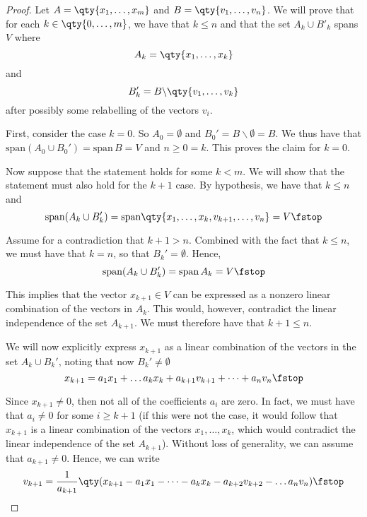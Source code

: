 \begin{proof}
  Let \( A=\qty{x_1,\dots,x_m} \) and \( B=\qty{v_1,\dots,v_n} \). We will prove that for each \( k\in\qty{0,\dots,m} \), we have that \( k\leq n \) and that the set \( A_k\cup B'_k \) spans \( V \) where
  \[ A_k=\qty{x_1,\dots,x_k} \]
  and
  \[ B_k'=B\backslash\qty{v_1,\dots,v_k} \]
  after possibly some relabelling of the vectors \( v_i \).

  \vspace{3mm}

  First, consider the case \( k=0 \). So \( A_0=\emptyset \) and \( B_0'=B\backslash\emptyset=B \). We thus have that \( \text{span}(A_0\cup B_0')=\text{span}\,B=V \) and \( n\geq 0=k \). This proves the claim for \( k=0 \).

  \vspace{3mm}

  Now suppose that the statement holds for some \( k<m \). We will show that the statement must also hold for the \( k+1 \) case. By hypothesis, we have that \( k\leq n \) and
  \[ \text{span}(A_k\cup B_k')=\text{span}\qty{x_1,\dots,x_k,v_{k+1},\dots,v_n}=V\fstop \]

  Assume for a contradiction that \( k+1>n \). Combined with the fact that \( k\leq n \), we must have that \( k=n \), so that \( B_k'=\emptyset \). Hence,
  \[ \text{span}(A_k\cup B_k')=\text{span}\,A_k=V\fstop \]

  This implies that the vector \( x_{k+1}\in V \) can be expressed as a nonzero linear combination of the vectors in \( A_k \). This would, however, contradict the linear independence of the set \( A_{k+1} \). We must therefore have that \( k+1\leq n \).

  \vspace{3mm}

  We will now explicitly express \( x_{k+1} \) as a linear combination of the vectors in the set \( A_k\cup B_k' \), noting that now \( B_k'\neq\emptyset \)
  \[ x_{k+1}=a_{1}x_1+\dots a_{k}x_k+a_{k+1}v_{k+1}+\dots+a_{n}v_n\fstop \]

  Since \( x_{k+1}\neq 0 \), then not all of the coefficients \( a_i \) are zero. In fact, we must have that \( a_i\neq 0 \) for some \( i\geq k+1 \) (if this were not the case, it would follow that \( x_{k+1} \) is a linear combination of the vectors \( x_1,\dots, x_k \), which would contradict the linear independence of the set \( A_{k+1} \)). Without loss of generality, we can assume that \( a_{k+1}\neq 0 \). Hence, we can write
  \[ v_{k+1}=\frac{1}{a_{k+1}}\qty(x_{k+1}-a_{1}x_1-\dots -a_{k}x_k-a_{k+2}v_{k+2}-\dots a_{n}v_n)\fstop \]


\end{proof}

